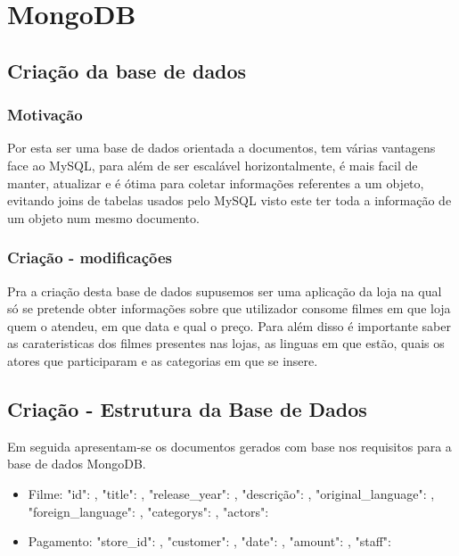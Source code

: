 \section{MongoDB}

\subsection{Criação da base de dados}

\subsubsection{Motivação}

Por esta ser uma base de dados orientada a documentos, tem várias vantagens face ao MySQL, para além de ser escalável horizontalmente, é mais facil de manter, atualizar e é ótima para coletar informações referentes a um objeto, evitando joins de tabelas usados pelo MySQL visto este ter toda a informação de um objeto num mesmo documento.

\subsubsection{Criação - modificações}

Pra a criação desta base de dados supusemos ser uma aplicação da loja na qual só se pretende obter informações sobre que utilizador consome filmes em que loja quem o atendeu, em que data e qual o preço. Para além disso é importante saber as carateristicas dos filmes presentes nas lojas, as linguas em que estão, quais os atores que participaram e as categorias em que se insere.

\subsection{Criação - Estrutura da Base de Dados}

\par Em seguida apresentam-se os documentos gerados com base nos requisitos para a base de dados MongoDB.\newline
\begin{itemize}
\item Filme:  {"id": , "title": , "release\_year": , "descrição": , "original\_language": , "foreign\_language": , "categorys": , "actors": }\newline

\item Pagamento: {"store\_id": , "customer": , "date": , "amount": , "staff": }
\end{itemize}

